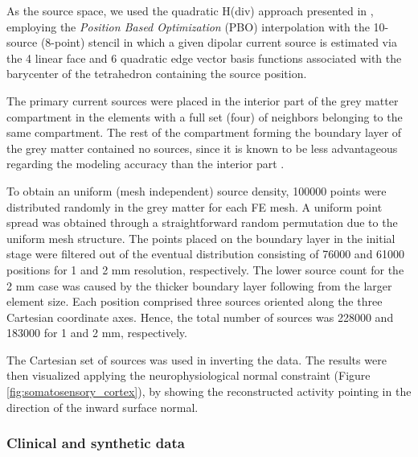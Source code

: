 \documentclass[5p]{elsarticle}
\begin{document}
As the source space, we used the  quadratic H(div) approach presented in \citep{pursiainen2016,miinalainen2019}, employing the {\em Position Based Optimization} (PBO) interpolation with the 10-source (8-point) stencil in which a given dipolar current source is estimated via the 4 linear face and 6 quadratic edge vector basis functions associated with the barycenter of the tetrahedron containing the source position. 

The primary current sources were placed in the interior part of the grey matter compartment in the elements with a full set (four) of neighbors belonging to the same compartment. The rest of the compartment forming the boundary layer of the grey matter contained no sources, since it is known to be less advantageous regarding the modeling accuracy than the interior part \cite{miinalainen2019}.

To obtain an uniform (mesh independent) source density, 100000 points were   distributed randomly in the grey matter for each FE mesh. A uniform point spread was obtained through a straightforward random permutation due to the uniform mesh structure. The points placed on the boundary layer in the initial stage were filtered out of the eventual distribution consisting of 76000 and 61000 positions for 1 and 2 mm resolution, respectively. The lower source count for the 2 mm case was caused by the thicker boundary layer following from the larger element size.   Each position comprised three sources oriented along the three Cartesian coordinate axes. Hence, the total number of sources was 228000 and 183000 for 1 and 2 mm, respectively.

The Cartesian set of sources was used in inverting the data. The results were then visualized applying the neurophysiological normal constraint (Figure \ref{fig:somatosensory_cortex}), by showing the reconstructed activity pointing in the direction of the inward surface normal. 

\subsubsection{Clinical and synthetic data}
\end{document}
